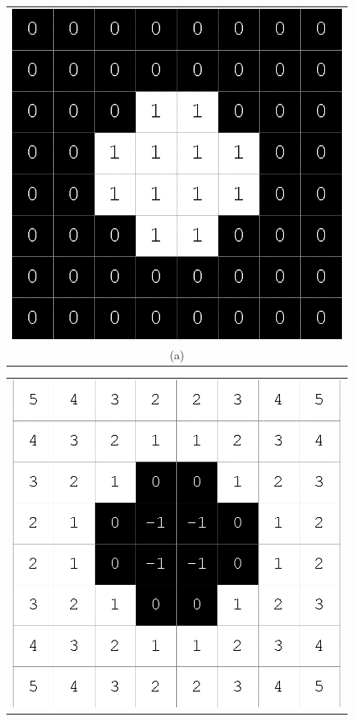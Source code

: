\begin{figure}[h!]
\centering
\begin{minipage}{.45\textwidth}
\begin{tabular}{c}
\includegraphics[width=.9\textwidth]{backgroundTheory/levelset/orgNew} \\
(a)
\end{tabular}
\end{minipage}
\begin{minipage}{.45\textwidth}
\begin{tabular}{c}
\includegraphics[width=.9\textwidth]{backgroundTheory/levelset/manhattan} \\

\end{tabular}
\end{minipage}
\end{figure}
